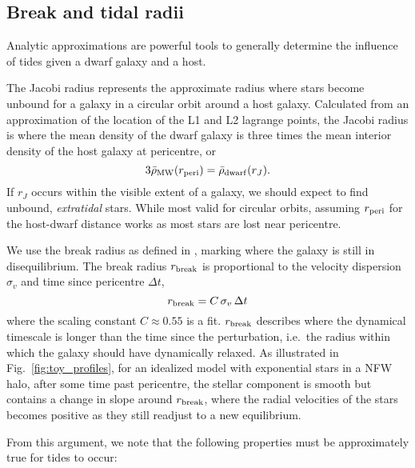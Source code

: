 \subsection{Break and tidal radii}\label{break-and-tidal-radii}

Analytic approximations are powerful tools to generally determine the
influence of tides given a dwarf galaxy and a host.

The Jacobi radius represents the approximate radius where stars become
unbound for a galaxy in a circular orbit around a host galaxy.
Calculated from an approximation of the location of the L1 and L2
lagrange points, the Jacobi radius is where the mean density of the
dwarf galaxy is three times the mean interior density of the host galaxy
at pericentre, or \begin{equation}{
3\bar \rho_{\rm MW}(r_{\rm peri}) = \bar \rho_{\rm dwarf}(r_J).
}\end{equation} If \(r_J\) occurs within the visible extent of a galaxy,
we should expect to find unbound, \emph{extratidal} stars. While most
valid for circular orbits, assuming \(r_{\rm peri}\) for the host-dwarf
distance works as most stars are lost near pericentre.

We use the break radius as defined in \citet{penarrubia+2009}, marking
where the galaxy is still in disequilibrium. The break radius
\(r_{\rm break}\) is proportional to the velocity dispersion
\(\sigma_v\) and time since pericentre \(\Delta t\), \begin{equation}{
r_{\rm break} = C\,\sigma_{v}\,\Delta t
}\end{equation} where the scaling constant \(C \approx 0.55\) is a fit.
\(r_{\rm break}\) describes where the dynamical timescale is longer than
the time since the perturbation, i.e.~the radius within which the galaxy
should have dynamically relaxed. As illustrated in
Fig.~\ref{fig:toy_profiles}, for an idealized model with exponential
stars in a NFW halo, after some time past pericentre, the stellar
component is smooth but contains a change in slope around
\(r_{\rm break}\), where the radial velocities of the stars becomes
positive as they still readjust to a new equilibrium.

From this argument, we note that the following properties must be
approximately true for tides to occur:

